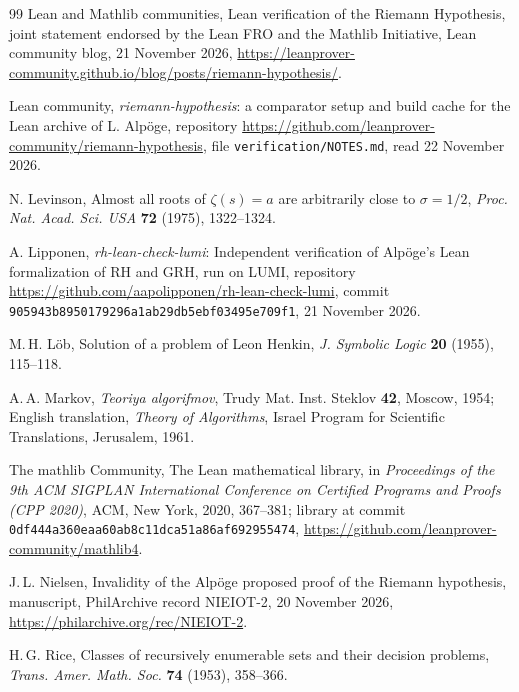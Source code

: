 \documentclass[11pt]{article}
\theoremstyle{definition}
\theoremstyle{remark}
\begin{document}
\begin{thebibliography}{99}
 Lean and Mathlib communities, Lean verification of the Riemann Hypothesis, joint statement endorsed by the Lean FRO and the Mathlib Initiative, Lean community blog, 21 November 2026, \url{https://leanprover-community.github.io/blog/posts/riemann-hypothesis/}.

 Lean community, \emph{riemann-hypothesis}: a comparator setup and build cache for the Lean archive of L. Alp\"oge, repository \url{https://github.com/leanprover-community/riemann-hypothesis}, file \nolinkurl{verification/NOTES.md}, read 22 November 2026.

 N. Levinson, Almost all roots of $\zeta(s)=a$ are arbitrarily close to $\sigma=1/2$, \emph{Proc. Nat. Acad. Sci. USA} \textbf{72} (1975), 1322--1324.

 A. Lipponen, \emph{rh-lean-check-lumi}: Independent verification of Alp\"oge's Lean formalization of RH and GRH, run on LUMI, repository \url{https://github.com/aapolipponen/rh-lean-check-lumi}, commit \nolinkurl{905943b8950179296a1ab29db5ebf03495e709f1}, 21 November 2026.

 M.\,H. L\"ob, Solution of a problem of Leon Henkin, \emph{J. Symbolic Logic} \textbf{20} (1955), 115--118.

 A.\,A. Markov, \emph{Teoriya algorifmov}, Trudy Mat. Inst. Steklov \textbf{42}, Moscow, 1954; English translation, \emph{Theory of Algorithms}, Israel Program for Scientific Translations, Jerusalem, 1961.

 The mathlib Community, The Lean mathematical library, in \emph{Proceedings of the 9th ACM SIGPLAN International Conference on Certified Programs and Proofs (CPP 2020)}, ACM, New York, 2020, 367--381; library at commit \nolinkurl{0df444a360eaa60ab8c11dca51a86af692955474}, \url{https://github.com/leanprover-community/mathlib4}.

 J.\,L. Nielsen, Invalidity of the Alp\"oge proposed proof of the Riemann hypothesis, manuscript, PhilArchive record NIEIOT-2, 20 November 2026, \url{https://philarchive.org/rec/NIEIOT-2}.

 H.\,G. Rice, Classes of recursively enumerable sets and their decision problems, \emph{Trans. Amer. Math. Soc.} \textbf{74} (1953), 358--366.


\end{thebibliography}
\end{document}
